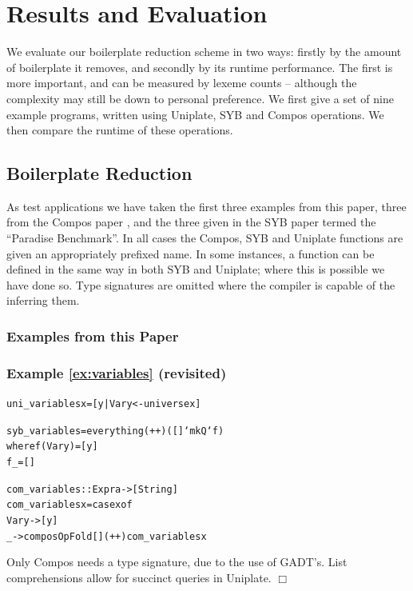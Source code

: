 \documentclass[preprint]{sigplanconf}
\newcommand{\noexample}{\hfill$\Box$}
\newenvironment{code}{\begin{alltt}\small}{\end{alltt}}
\newenvironment{revisit}[1]{\subsubsection*{Example #1 (revisited)}}{\noexample}
\newcommand{\ignore}{}
\begin{document}
\section{Results and Evaluation}
\label{sec:results}

We evaluate our boilerplate reduction scheme in two ways: firstly by the amount of boilerplate it removes, and secondly by its runtime performance. The first is more important, and can be measured by lexeme counts -- although the complexity may still be down to personal preference. We first give a set of nine example programs, written using Uniplate, SYB and Compos operations. We then compare the runtime of these operations.

\subsection{Boilerplate Reduction}
\label{sec:results_boilerplate}

As test applications we have taken the first three examples from this paper, three from the Compos paper \citep{bringert:compos}, and the three given in the SYB paper \citep{lammel:syb} termed the ``Paradise Benchmark''. In all cases the Compos, SYB and Uniplate functions are given an appropriately prefixed name. In some instances, a function can be defined in the same way in both SYB and Uniplate; where this is possible we have done so. Type signatures are omitted where the compiler is capable of the inferring them.

\subsubsection{Examples from this Paper}

\begin{revisit}{\ref{ex:variables}}

\ignore\begin{code}
uni_variables x = [y | Var y <- universe x]

syb_variables = everything (++) ([] `mkQ` f)
    where  f (Var y)  = [y]
           f _        = []

com_variables :: Expr a -> [String]
com_variables x = case x of
    Var y -> [y]
    _ -> composOpFold [] (++) com_variables x
\end{code}

Only Compos needs a type signature, due to the use of GADT's. List comprehensions allow for succinct queries in Uniplate.
\end{revisit}
\end{document}
